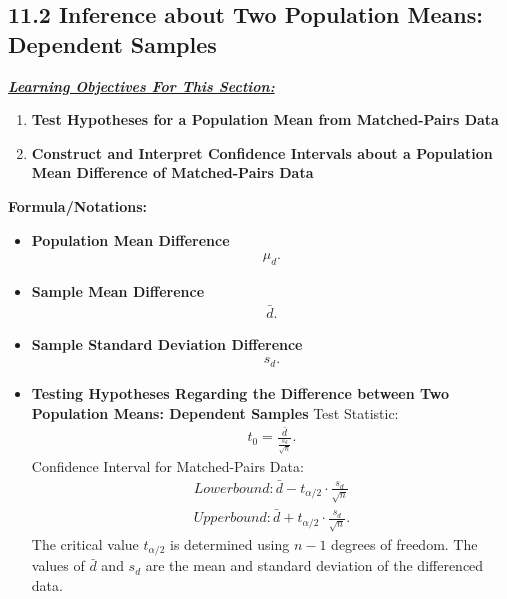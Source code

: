 \documentclass{report}
\begin{document}
    \pagebreak 
    \subsection*{11.2 Inference about Two Population Means: Dependent Samples}
    \bigbreak \noindent 
    \bigbreak \noindent 
    \textbf{\textit{\underline{Learning Objectives For This Section:}}}
    \begin{enumerate}
        \item \textbf{Test Hypotheses for a Population Mean from Matched-Pairs Data}
        \item \textbf{Construct and Interpret Confidence Intervals about a Population Mean Difference of Matched-Pairs Data}
    \end{enumerate}
    \bigbreak \noindent 
    \textbf{Formula/Notations:}
    \begin{itemize}
        \item \textbf{Population Mean Difference}
            \begin{align*}
                \mu_{d}
            .\end{align*}
        \item \textbf{Sample Mean Difference}
            \begin{align*}
                \bar{d}
            .\end{align*}
        \item \textbf{Sample Standard Deviation Difference}
            \begin{align*}
                s_{d}
            .\end{align*}
        \item \textbf{Testing Hypotheses Regarding the Difference between Two Population Means: Dependent Samples}
            \bigbreak \noindent 
            Test Statistic:
            \begin{align*}
                t_{0} = \frac{\bar{d}}{\frac{s_{d}}{\sqrt{n}}}
            .\end{align*}
            \bigbreak \noindent 
            Confidence Interval for Matched-Pairs Data:
            \begin{align*}
                Lower bound: \bar{d} - t_{\alpha/2} \cdot \frac{s_d}{\sqrt{n}} \\
                Upper bound: \bar{d} + t_{\alpha/2} \cdot \frac{s_d}{\sqrt{n}}
            .\end{align*}
            \bigbreak \noindent 
            The critical value $t_{\alpha/2}$ is determined using $n-1$ degrees of freedom. The values of $\bar{d}$ and $s_d$ are the mean and standard deviation of the differenced data.
            \bigbreak \noindent 
            \bigbreak \noindent 
    \end{itemize}
\end{document}
